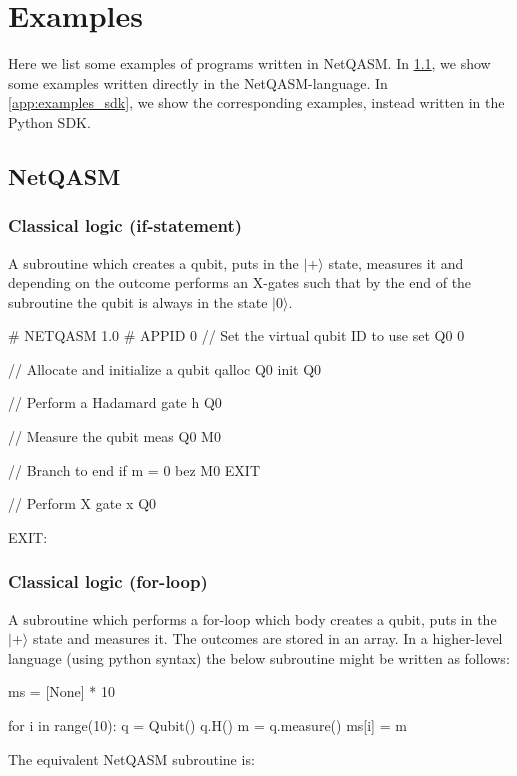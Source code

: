 \section{Examples}
Here we list some examples of programs written in \ac{NetQASM}.
In \cref{netqasm:sec:examples_netqasm}, we show some examples written directly in the \ac{NetQASM}-language.
In \cref{app:examples_sdk}, we show the corresponding examples, instead written in the Python SDK.

\subsection{NetQASM}
\label{netqasm:sec:examples_netqasm}

\subsubsection{Classical logic (if-statement)}
\label{netqasm:sec:example_nq_if}
A subroutine which creates a qubit, puts in the $|+\rangle$ state, measures it and depending on the outcome performs an X-gates such that by the end of the subroutine the qubit is always in the state $|0\rangle$.
\begin{nqcode}
# NETQASM 1.0
# APPID 0
// Set the virtual qubit ID to use
set Q0 0

// Allocate and initialize a qubit
qalloc Q0
init Q0

// Perform a Hadamard gate
h Q0

// Measure the qubit
meas Q0 M0

// Branch to end if m = 0
bez M0 EXIT

// Perform X gate
x Q0

EXIT:\end{nqcode}

\subsubsection{Classical logic (for-loop)}
\label{netqasm:sec:example_nq_for}
A subroutine which performs a for-loop which body creates a qubit, puts in the $|+\rangle$ state and measures it. The outcomes are stored in an array.
In a higher-level language (using python syntax) the below subroutine might be written as follows:
\begin{pycode}
ms = [None] * 10

for i in range(10):
  q = Qubit()
  q.H()
  m = q.measure()
  ms[i] = m
\end{pycode}
The equivalent \ac{NetQASM} subroutine is:

